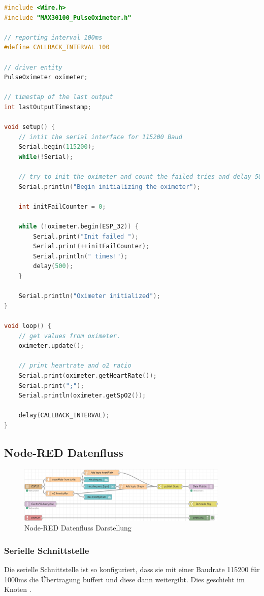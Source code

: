 \documentclass[12pt,oneside]{article}
\newcommand{\quoteM}[1]{\glqq {#1}\grqq{}}
\begin{document}
  \begin{lstlisting}[language=C, caption={Quellcode des ESP32-Programms}, captionpos=b, label=srcEsp]
#include <Wire.h>
#include "MAX30100_PulseOximeter.h"

// reporting interval 100ms
#define CALLBACK_INTERVAL 100

// driver entity
PulseOximeter oximeter;

// timestap of the last output
int lastOutputTimestamp;

void setup() {
	// intit the serial interface for 115200 Baud
	Serial.begin(115200);
	while(!Serial);
	
	// try to init the oximeter and count the failed tries and delay 500ms.
	Serial.println("Begin initializing the oximeter");
	
	int initFailCounter = 0;
	
	while (!oximeter.begin(ESP_32)) {
		Serial.print("Init failed ");
		Serial.print(++initFailCounter);
		Serial.println(" times!");
		delay(500);
	}
	
	Serial.println("Oximeter initialized");
}

void loop() {
	// get values from oximeter.
	oximeter.update();
	
	// print heartrate and o2 ratio
	Serial.print(oximeter.getHeartRate());
	Serial.print(";");
	Serial.println(oximeter.getSpO2());
	
	delay(CALLBACK_INTERVAL);
}
  \end{lstlisting}

  \subsection{Node-RED Datenfluss}
  \begin{figure}[tph!]
  	\includegraphics[width=0.9\textwidth]{node red flow}
  	\caption{Node-RED\cite{nodeRED} Datenfluss Darstellung}
  	\label{fig:nodeRedFlow}
  \end{figure}
	\subsubsection*{Serielle Schnittstelle}
	  Die serielle Schnittstelle ist so konfiguriert, dass sie mit einer Baudrate 115200 für 1000ms die Übertragung buffert und diese dann weitergibt. Dies geschieht im Knoten \quoteM{ESP32}.
\end{document}

